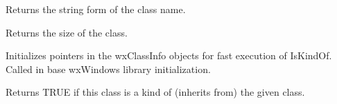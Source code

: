 

Returns the string form of the class name.



Returns the size of the class.



Initializes pointers in the wxClassInfo objects for fast execution
of IsKindOf. Called in base wxWindows library initialization.

\label{wxclassinfoiskindof}


Returns TRUE if this class is a kind of (inherits from) the given class.


